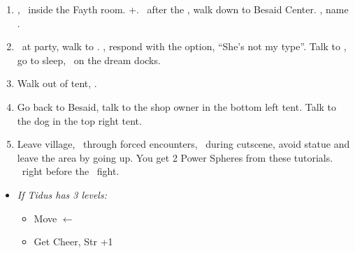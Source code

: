\begin{enumerate}[resume]
	\item \cs[1:00], \sd\ inside the Fayth room. \fmv+\cs[1:00]. \sd\ after the \fmv, walk down to Besaid Center. \cs[1:40], name \valefor.
	\item \sd\ at party, walk to \yuna. \sd, respond with the  option, ``She's not my type''. Talk to \wakka, go to sleep, \sd\ on the dream docks.
	\item Walk out of tent, \sd.
	\item Go back to Besaid, talk to the shop owner in the bottom left tent. Talk to the dog in the top right tent.
	\item Leave village, \sd\ through forced encounters, \sd\ during cutscene, avoid statue and leave the area by going up. You get 2 Power Spheres from these tutorials. \skippablefmv\ right before the \kimahri\ fight.
\end{enumerate}
\begin{spheregrid}
	\begin{itemize}
		\item \textit{If Tidus has 3 levels:}
		      \begin{itemize}
			      \item Move $\leftarrow$
			      \item Get Cheer, Str +1
		      \end{itemize}
	\end{itemize}
\end{spheregrid}
